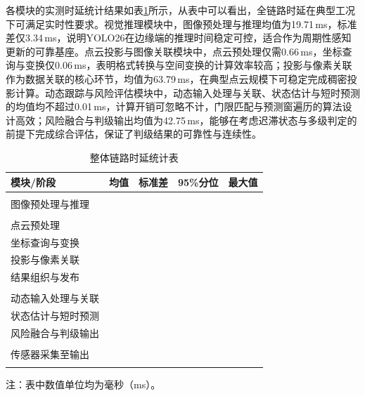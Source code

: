 各模块的实测时延统计结果如表\ref{tab:ch6_latency_overall}所示，从表中可以看出，全链路时延在典型工况下可满足实时性要求。视觉推理模块中，图像预处理与推理均值为19.71\,ms，标准差仅3.34\,ms，说明YOLO26在边缘端的推理时间稳定可控，适合作为周期性感知更新的可靠基座。点云投影与图像关联模块中，点云预处理仅需0.66\,ms，坐标查询与变换仅0.06\,ms，表明格式转换与空间变换的计算效率较高；投影与像素关联作为数据关联的核心环节，均值为63.79\,ms，在典型点云规模下可稳定完成稠密投影计算。动态跟踪与风险评估模块中，动态输入处理与关联、状态估计与短时预测的均值均不超过0.01\,ms，计算开销可忽略不计，门限匹配与预测窗遍历的算法设计高效；风险融合与判级输出均值为42.75\,ms，能够在考虑迟滞状态与多级判定的前提下完成综合评估，保证了判级结果的可靠性与连续性。

\begin{table}[htbp]
\centering
\caption{整体链路时延统计表}
\label{tab:ch6_latency_overall}

\begin{tabular*}{\textwidth}{@{\extracolsep{\fill}}>{\centering\arraybackslash}m{3.4cm}>{\centering\arraybackslash}m{1.6cm}>{\centering\arraybackslash}m{1.6cm}>{\centering\arraybackslash}m{1.6cm}>{\centering\arraybackslash}m{1.6cm}}
\Xhline{1pt}
\textbf{模块/阶段} & \textbf{均值} & \textbf{标准差} & \textbf{95\%{}分位} & \textbf{最大值} \\
\hline
\multicolumn{5}{l}{\textbf{一、视觉推理模块}} \\
\hline
图像预处理与推理 & 19.71 & 3.34 & 25.39 & 61.08 \\
\hline
\multicolumn{5}{l}{\textbf{二、点云投影与图像关联模块}} \\
\hline
点云预处理 & 0.66 & 0.22 & 0.94 & 2.50 \\
坐标查询与变换 & 0.06 & 0.03 & 0.08 & 0.69 \\
投影与像素关联 & 63.79 & 17.18 & 80.65 & 148.99 \\
结果组织与发布 & 4.77 & 1.59 & 7.09 & 19.91 \\
\hline
\multicolumn{5}{l}{\textbf{三、动态跟踪与风险评估模块}} \\
\hline
动态输入处理与关联 & 0.01 & 0.00 & 0.01 & 0.02 \\
状态估计与短时预测 & 0.00 & 0.00 & 0.00 & 0.02 \\
风险融合与判级输出 & 42.75 & 27.35 & 83.87 & 110.68 \\
\hline
\multicolumn{5}{l}{\textbf{四、端到端总时延}} \\
\hline
传感器采集至输出 & 101.43 & 18.82 & 123.17 & 200.58 \\
\Xhline{1pt}
\end{tabular*}
\parbox{\textwidth}{\vspace{0.5em}\small\raggedright 注：表中数值单位均为毫秒（ms）。}
\end{table}

